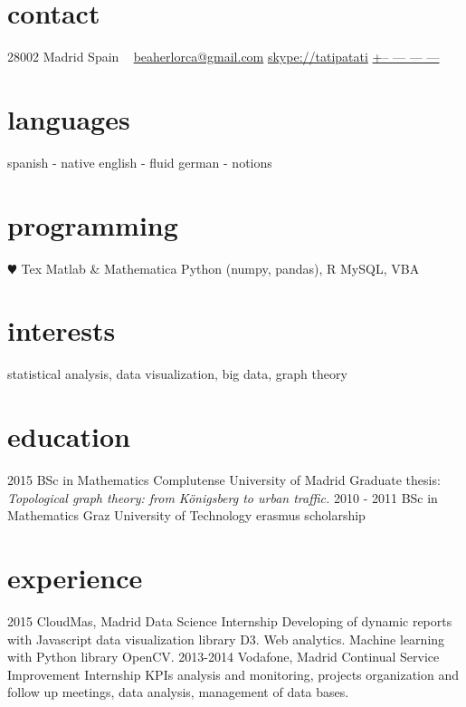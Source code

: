 \documentclass[]{friggeri-cv}
\begin{document}
\ifenglish
{}
       {}


\begin{aside}
  \section{contact}
    28002 Madrid
    Spain
    ~
    \href{mailto:beaherlorca@gmail.com}{beaherlorca@gmail.com}
    \href{skype:<tatipatati>[add]}{skype://tatipatati}
    \href{tel:xxxxxxxxxxx}{+-- --- --- ---}
  \section{languages}
    spanish - native
    english - fluid
    german - notions
  \section{programming}
    {\color{red} $\varheartsuit$} Tex
    Matlab \& Mathematica
    Python (numpy, pandas), R
    MySQL, VBA
\end{aside}

\section{interests}

statistical analysis, data visualization, big data, graph theory

\section{education}

\begin{entrylist}
  \entry
    {2015}
    {BSc in Mathematics}
    {Complutense University of Madrid}
    {Graduate thesis: \emph{Topological graph theory: from Königsberg to urban traffic.}}
  \entry
    {2010 - 2011}
    {BSc in Mathematics}
    {Graz University of Technology}
    {erasmus scholarship}
\end{entrylist}

\section{experience}

\begin{entrylist}
  \entry
    {2015}
    {CloudMas, Madrid}
    {Data Science Internship}
    {Developing of dynamic reports with Javascript data visualization library D3. Web analytics. Machine learning with Python library OpenCV.}
  \entry
    {2013-2014}
    {Vodafone, Madrid}
    {Continual Service Improvement Internship}
    {KPIs analysis and monitoring, projects organization and follow up meetings, data analysis, management of data bases.}
\end{entrylist}
\end{document}
